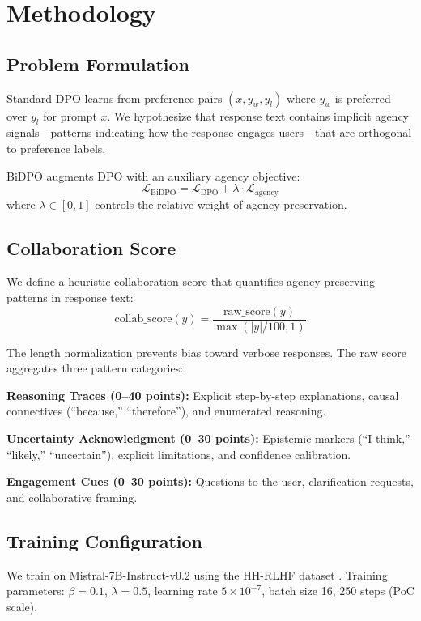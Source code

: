 \section{Methodology}

\subsection{Problem Formulation}

Standard DPO learns from preference pairs $(x, y_w, y_l)$ where $y_w$ is preferred over $y_l$ for prompt $x$. We hypothesize that response text contains implicit agency signals---patterns indicating how the response engages users---that are orthogonal to preference labels.

BiDPO augments DPO with an auxiliary agency objective:
\begin{equation}
\mathcal{L}_{\text{BiDPO}} = \mathcal{L}_{\text{DPO}} + \lambda \cdot \mathcal{L}_{\text{agency}}
\end{equation}
where $\lambda \in [0, 1]$ controls the relative weight of agency preservation.

\subsection{Collaboration Score}

We define a heuristic collaboration score that quantifies agency-preserving patterns in response text:
\begin{equation}
\text{collab\_score}(y) = \frac{\text{raw\_score}(y)}{\max(|y|/100, 1)}
\end{equation}

The length normalization prevents bias toward verbose responses. The raw score aggregates three pattern categories:

\textbf{Reasoning Traces (0--40 points):} Explicit step-by-step explanations, causal connectives (``because,'' ``therefore''), and enumerated reasoning.

\textbf{Uncertainty Acknowledgment (0--30 points):} Epistemic markers (``I think,'' ``likely,'' ``uncertain''), explicit limitations, and confidence calibration.

\textbf{Engagement Cues (0--30 points):} Questions to the user, clarification requests, and collaborative framing.

\subsection{Training Configuration}

We train on Mistral-7B-Instruct-v0.2 using the HH-RLHF dataset \cite{bai2022training}. Training parameters: $\beta = 0.1$, $\lambda = 0.5$, learning rate $5 \times 10^{-7}$, batch size 16, 250 steps (PoC scale).
